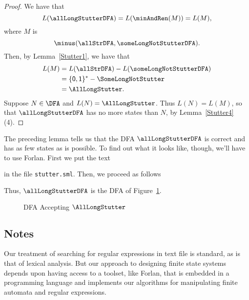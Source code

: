 \begin{proof}
We have that
\begin{displaymath}
L(\allLongStutterDFA) = L(\minAndRen(M)) = L(M) ,
\end{displaymath}
where $M$ is
\begin{displaymath}
\minus(\allStrDFA, \someLongNotStutterDFA) .
\end{displaymath}
Then, by Lemma~\ref{Stutter1}, we have that
\begin{align*}
L(M) &= L(\allStrDFA) - L(\someLongNotStutterDFA) \\
&= \{\mathsf{0,1}\}^* - \SomeLongNotStutter \\
&= \AllLongStutter .
\end{align*}
Suppose $N\in\DFA$ and $L(N)=\AllLongStutter$.  Thus $L(N)=L(M)$, so
that $\allLongStutterDFA$ has no more states than $N$, by
Lemma~\ref{Stutter4}(4).
\end{proof}

The preceding lemma tells us that the DFA $\allLongStutterDFA$
is correct and has as few states as is possible.
To find out what it looks like, though, we'll have to use
Forlan.  First we put the text


%
%
%
%
%
%
%
%
%
%
%
%
%
%
%
in the file \texttt{stutter.sml}.  Then, we proceed as follows

Thus, $\allLongStutterDFA$ is the DFA of Figure~\ref{StuttDFASynExamp}.
\begin{figure}
\begin{center}

\end{center}
\caption{DFA Accepting $\AllLongStutter$}
\label{StuttDFASynExamp}
\end{figure}
%
%

\subsection{Notes}

Our treatment of searching for regular expressions in text file is
standard, as is that of lexical analysis.  But our approach to
designing finite state systems depends upon having access to a
toolset, like Forlan, that is embedded in a programming language and
implements our algorithms for manipulating finite automata and regular
expressions.

